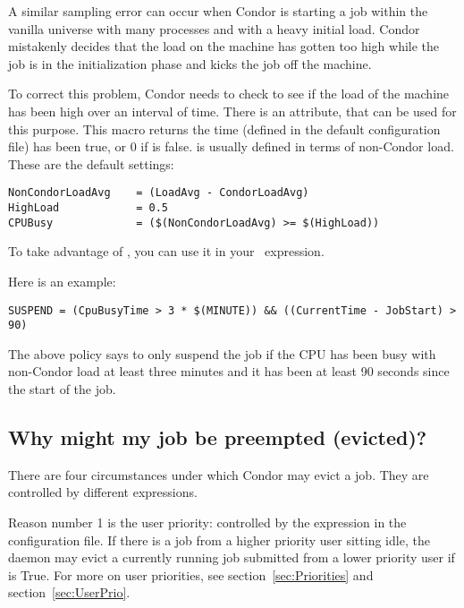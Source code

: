 A similar sampling error can occur when Condor is starting a job
within the vanilla universe with many processes and with a
heavy initial load.
Condor mistakenly decides that the load on the machine has gotten too
high while the job is in the initialization phase and kicks the job off
the machine.

To correct this problem, Condor needs to check to see if the load of the
machine has been high over an interval of time.
There is an attribute,  that can be used for
this purpose.
This macro returns the time  (defined in the default
configuration file) has been true, or 0 if  is false.
 is usually defined in terms of non-Condor load.
These are the default settings:

\footnotesize
\begin{verbatim}
NonCondorLoadAvg    = (LoadAvg - CondorLoadAvg)
HighLoad            = 0.5
CPUBusy             = ($(NonCondorLoadAvg) >= $(HighLoad))
\end{verbatim}
\normalsize

To take advantage of , you can use it in your
\ expression. 

Here is an example:
\footnotesize
\begin{verbatim}
SUSPEND = (CpuBusyTime > 3 * $(MINUTE)) && ((CurrentTime - JobStart) > 90)
\end{verbatim}
\normalsize

The above policy says to only suspend the job if the CPU has been busy
with non-Condor load at least three minutes and it has been at least 90
seconds since the start of the job.


\subsection*{Why might my job be preempted (evicted)?}

There are four circumstances under which Condor may evict a job.
They are controlled by different expressions.

Reason number 1 is the user priority:
controlled by the 
expression in the configuration file.
If there is a job from a 
higher priority user sitting idle,
the  daemon may evict 
a currently running job submitted from a lower priority user if 
 is True.
For more on user priorities,
see section~\ref{sec:Priorities} and
section~\ref{sec:UserPrio}.

